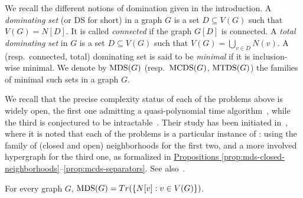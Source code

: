 We recall the different notions of domination given in the introduction.
A \emph{dominating set} (or DS for short) in a graph $G$ is a set $D\subseteq V(G)$ such that $V(G)=N[D]$.
It is called \emph{connected} if the graph $G[D]$ is connected.
A \emph{total dominating set} in $G$ is a set $D\subseteq V(G)$ such that $V(G)=\bigcup_{v\in D} N(v)$.
A (resp.~connected, total) dominating set is said to be \emph{minimal} if it is inclusion-wise minimal.
We denote by $\operatorname{MDS}(G)$ (resp.~$\operatorname{MCDS}(G)$, $\operatorname{MTDS}(G)$) the families of minimal such sets in a graph $G$.

{}

We recall that the precise complexity status of each of the problems above is widely open, the first one admitting a quasi-polynomial time algorithm~\cite{fredman1996complexity,kante2014split}, while the third is conjectured to be intractable~\cite{lorentz2015open}.
Their study has been initiated in~\cite{kante2014split}, where it is noted that each of the problems is a particular instance of \transenum{}: using the family of (closed and open) neighborhoods for the first two, and a more involved hypergraph for the third one, as formalized in \hyperref[prop:mds-closed-neighborhoods]{Propositions \ref*{prop:mds-closed-neighborhoods}}--\ref{prop:mcds-separators}.
See also~\cite{berge1984hypergraphs}.

\begin{proposition}\label{prop:mds-closed-neighborhoods}
    For every graph $G$, $\operatorname{MDS}(G)=Tr(\{N[v] : v\in V(G)\})$.
\end{proposition}

